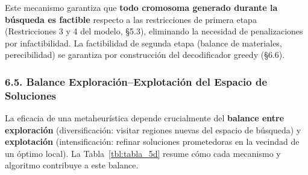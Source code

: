 \documentclass[
  spanish,
  12pt,
]{article}
\begin{document}
Este mecanismo garantiza que \textbf{todo cromosoma generado durante la
búsqueda es factible} respecto a las restricciones de primera etapa
(Restricciones 3 y 4 del modelo, §5.3), eliminando la necesidad de
penalizaciones por infactibilidad. La factibilidad de segunda etapa
(balance de materiales, perecibilidad) se garantiza por construcción del
decodificador greedy (§6.6).

\subsubsection{6.5. Balance Exploración--Explotación del Espacio de
Soluciones}\label{balance-exploraciuxf3nexplotaciuxf3n-del-espacio-de-soluciones}

La eficacia de una metaheurística depende crucialmente del
\textbf{balance entre exploración} (diversificación: visitar regiones
nuevas del espacio de búsqueda) y \textbf{explotación} (intensificación:
refinar soluciones prometedoras en la vecindad de un óptimo local). La
Tabla~\ref{tbl:tabla_5d} resume cómo cada mecanismo y algoritmo
contribuye a este balance.
\end{document}
